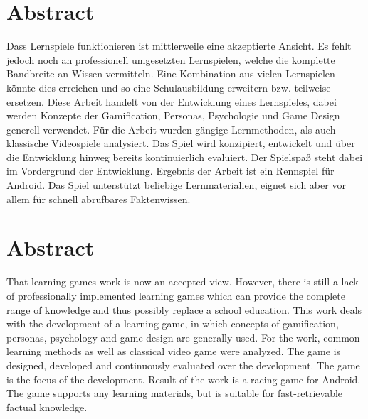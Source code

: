 \section*{Abstract}
Dass Lernspiele funktionieren ist mittlerweile eine akzeptierte Ansicht. Es fehlt jedoch noch an professionell umgesetzten Lernspielen, welche die komplette Bandbreite an Wissen vermitteln. Eine Kombination aus vielen Lernspielen könnte dies erreichen und so eine Schulausbildung erweitern bzw. teilweise ersetzen.
Diese Arbeit handelt von der Entwicklung eines Lernspieles, dabei werden Konzepte der Gamification, Personas, Psychologie und Game Design generell verwendet. Für die Arbeit wurden gängige Lernmethoden, als auch klassische Videospiele analysiert. Das Spiel wird konzipiert, entwickelt und über die Entwicklung hinweg bereits kontinuierlich evaluiert. Der Spielspaß steht dabei im Vordergrund der Entwicklung.
Ergebnis der Arbeit ist ein Rennspiel für Android. Das Spiel unterstützt beliebige Lernmaterialien, eignet sich aber vor allem für schnell abrufbares Faktenwissen.

\vfill

\section*{Abstract}
That learning games work is now an accepted view. However, there is still a lack of professionally implemented learning games which can provide the complete range of knowledge and thus possibly replace a school education.
This work deals with the development of a learning game, in which concepts of gamification, personas, psychology and game design are generally used. For the work, common learning methods as well as classical video game were analyzed. The game is designed, developed and continuously evaluated over the development. The game is the focus of the development.
Result of the work is a racing game for Android. The game supports any learning materials, but is suitable for fast-retrievable factual knowledge.

\vfill\vfill\newpage
